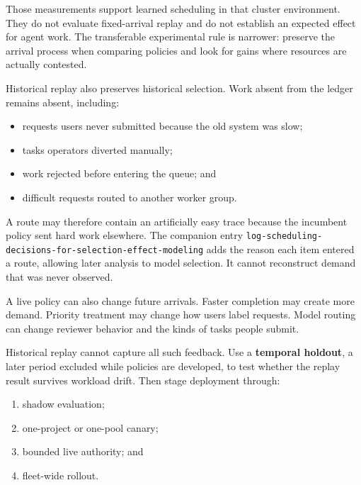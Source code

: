 Those measurements support learned scheduling in that cluster environment. They do not evaluate fixed-arrival replay and do not establish an expected effect for agent work. The transferable experimental rule is narrower: preserve the arrival process when comparing policies and look for gains where resources are actually contested.


Historical replay also preserves historical selection. Work absent from the ledger remains absent, including:

\begin{itemize}
\tightlist
\item
  requests users never submitted because the old system was slow;
\item
  tasks operators diverted manually;
\item
  work rejected before entering the queue; and
\item
  difficult requests routed to another worker group.
\end{itemize}

A route may therefore contain an artificially easy trace because the incumbent policy sent hard work elsewhere. The companion entry \texttt{log-scheduling-decisions-for-selection-effect-modeling} adds the reason each item entered a route, allowing later analysis to model selection. It cannot reconstruct demand that was never observed.

A live policy can also change future arrivals. Faster completion may create more demand. Priority treatment may change how users label requests. Model routing can change reviewer behavior and the kinds of tasks people submit.


Historical replay cannot capture all such feedback. Use a \textbf{temporal holdout}, a later period excluded while policies are developed, to test whether the replay result survives workload drift. Then stage deployment through:

\begin{enumerate}
\def\labelenumi{\arabic{enumi}.}
\tightlist
\item
  shadow evaluation;
\item
  one-project or one-pool canary;
\item
  bounded live authority; and
\item
  fleet-wide rollout.
\end{enumerate}

